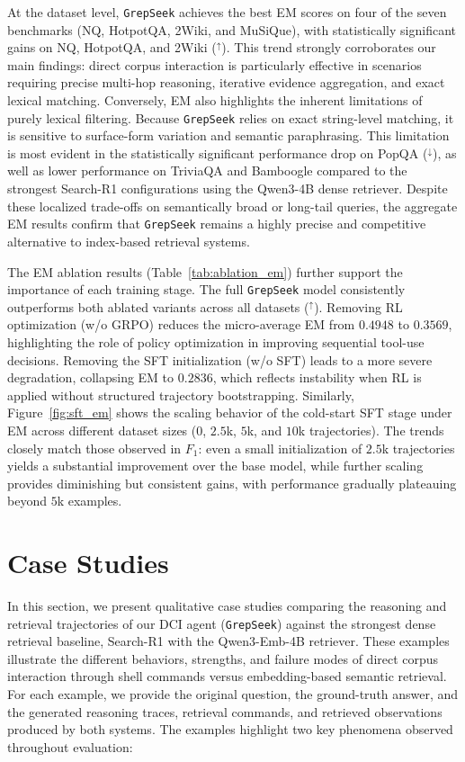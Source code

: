 \documentclass{llmxive}
\providecommand{\ourmethod}{\texttt{GrepSeek}\xspace}
\begin{document}
At the dataset level, \ourmethod{} achieves the best EM scores on four of the seven benchmarks (NQ, HotpotQA, 2Wiki, and MuSiQue), with statistically significant gains on NQ, HotpotQA, and 2Wiki ($^\uparrow$). This trend strongly corroborates our main findings: direct corpus interaction is particularly effective in scenarios requiring precise multi-hop reasoning, iterative evidence aggregation, and exact lexical matching. Conversely, EM also highlights the inherent limitations of purely lexical filtering. Because \ourmethod{} relies on exact string-level matching, it is sensitive to surface-form variation and semantic paraphrasing. This limitation is most evident in the statistically significant performance drop on PopQA ($^\downarrow$), as well as lower performance on TriviaQA and Bamboogle compared to the strongest Search-R1 configurations using the Qwen3-4B dense retriever. Despite these localized trade-offs on semantically broad or long-tail queries, the aggregate EM results confirm that \ourmethod{} remains a highly precise and competitive alternative to index-based retrieval systems.

The EM ablation results (Table~\ref{tab:ablation_em}) further support the importance of each training stage. The full \ourmethod{} model consistently outperforms both ablated variants across all datasets ($^\uparrow$). Removing RL optimization (w/o GRPO) reduces the micro-average EM from $0.4948$ to $0.3569$, highlighting the role of policy optimization in improving sequential tool-use decisions. Removing the SFT initialization (w/o SFT) leads to a more severe degradation, collapsing EM to $0.2836$, which reflects instability when RL is applied without structured trajectory bootstrapping. Similarly, Figure~\ref{fig:sft_em} shows the scaling behavior of the cold-start SFT stage under EM across different dataset sizes ($0$, $2.5$k, $5$k, and $10$k trajectories). The trends closely match those observed in $F_1$: even a small initialization of $2.5$k trajectories yields a substantial improvement over the base model, while further scaling provides diminishing but consistent gains, with performance gradually plateauing beyond $5$k examples.





\section{Case Studies}
\label{app:case-studies}


In this section, we present qualitative case studies comparing the reasoning and retrieval trajectories of our DCI agent (\ourmethod{}) against the strongest dense retrieval baseline, Search-R1 with the Qwen3-Emb-4B retriever. These examples illustrate the different behaviors, strengths, and failure modes of direct corpus interaction through shell commands versus embedding-based semantic retrieval. For each example, we provide the original question, the ground-truth answer, and the generated reasoning traces, retrieval commands, and retrieved observations produced by both systems. The examples highlight two key phenomena observed throughout evaluation:
\end{document}

